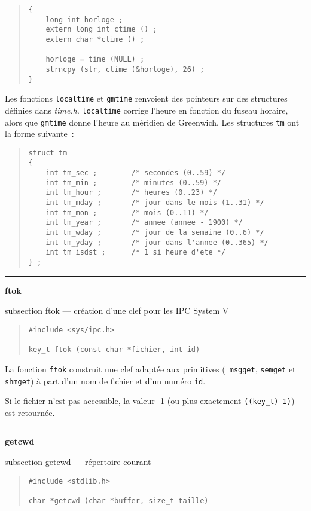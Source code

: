 \documentclass [twoside] {report}
\newcommand {\primitive} [1]
    {
	{\large \bf #1}
	\addcontentsline {toc} {subsection} {#1}
    }
\newcommand {\separation}
    {
	\vspace {7mm}
	\nopagebreak
	\hrule
    }
\begin{document}
\begin {quote}
\begin {verbatim}
{
    long int horloge ;
    extern long int ctime () ;
    extern char *ctime () ;

    horloge = time (NULL) ;
    strncpy (str, ctime (&horloge), 26) ;
}
\end{verbatim}
\end {quote}

Les fonctions {\tt localtime} et {\tt gmtime} renvoient des
pointeurs sur des structures définies dans {\em time.h}.
{\tt localtime} corrige l'heure en fonction du fuseau horaire,
alors que {\tt gmtime} donne l'heure au méridien de Greenwich.
Les structures {\tt tm} ont la forme suivante~:

\begin {quote}
\begin {verbatim}
struct tm
{
    int tm_sec ;        /* secondes (0..59) */
    int tm_min ;        /* minutes (0..59) */
    int tm_hour ;       /* heures (0..23) */
    int tm_mday ;       /* jour dans le mois (1..31) */
    int tm_mon ;        /* mois (0..11) */
    int tm_year ;       /* annee (annee - 1900) */
    int tm_wday ;       /* jour de la semaine (0..6) */
    int tm_yday ;       /* jour dans l'annee (0..365) */
    int tm_isdst ;      /* 1 si heure d'ete */
} ;
\end{verbatim}
\end {quote}


\separation 
\primitive {ftok} --- création d'une clef pour les IPC System V

\begin {quote}
\begin {verbatim}
#include <sys/ipc.h>

key_t ftok (const char *fichier, int id)
\end{verbatim}
\end {quote}

La fonction {\tt ftok} construit une clef adaptée aux primitives ({\tt
msgget}, {\tt semget} et {\tt shmget}) à part d'un nom de fichier et d'un
numéro {\tt id}.

Si le fichier n'est pas accessible, la valeur -1 (ou plus exactement
\verb|((key_t)-1)|) est retournée.


\separation 
\primitive {getcwd} --- répertoire courant

\begin {quote}
\begin {verbatim}
#include <stdlib.h>

char *getcwd (char *buffer, size_t taille)
\end{verbatim}
\end {quote}
\end{document}
